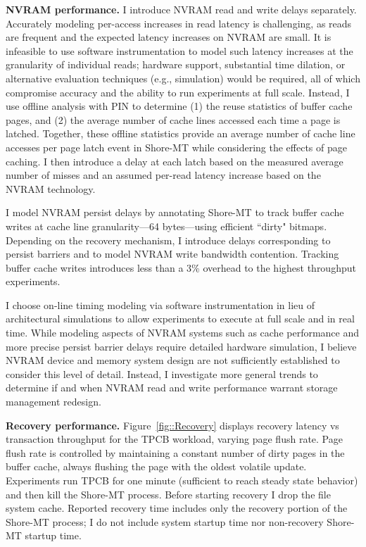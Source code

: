 \textbf{NVRAM performance.}
I introduce NVRAM read and write delays separately.
Accurately modeling per-access increases in read latency is challenging, as reads are frequent and the expected latency increases on NVRAM are small.
It is infeasible to use software instrumentation to model such latency increases at the granularity of individual reads; hardware support, substantial time dilation, or alternative evaluation techniques (e.g., simulation) would be required, all of which compromise accuracy and the ability to run experiments at full scale.
Instead, I use offline analysis with PIN \cite{LukCohn05} to determine (1) the reuse statistics of buffer cache pages, and (2) the average number of cache lines accessed each time a page is latched.
Together, these offline statistics provide an average number of cache line accesses per page latch event in Shore-MT while considering the effects of page caching.
I then introduce a delay at each latch based on the measured average number of misses and an assumed per-read latency increase based on the NVRAM technology.

I model NVRAM persist delays by annotating Shore-MT to track buffer cache writes at cache line granularity---64 bytes---using efficient ``dirty" bitmaps.
Depending on the recovery mechanism, I introduce delays corresponding to persist barriers and to model NVRAM write bandwidth contention.
Tracking buffer cache writes introduces less than a 3\% overhead to the highest throughput experiments.

I choose on-line timing modeling via software instrumentation in lieu of architectural simulations to allow experiments to execute at full scale and in real time.
While modeling aspects of NVRAM systems such as cache performance and more precise persist barrier delays require detailed hardware simulation, I believe NVRAM device and memory system design are not sufficiently established to consider this level of detail.
Instead, I investigate more general trends to determine if and when NVRAM read and write performance warrant storage management redesign.

\textbf{Recovery performance.} Figure~\ref{fig::Recovery} displays recovery latency vs transaction throughput for the TPCB workload, varying page flush rate.
Page flush rate is controlled by maintaining a constant number of dirty pages in the buffer cache, always flushing the page with the oldest volatile update.
Experiments run TPCB for one minute (sufficient to reach steady state behavior) and then kill the Shore-MT process.
Before starting recovery I drop the file system cache.
Reported recovery time includes only the recovery portion of the Shore-MT process; I do not include system startup time nor non-recovery Shore-MT startup time.

